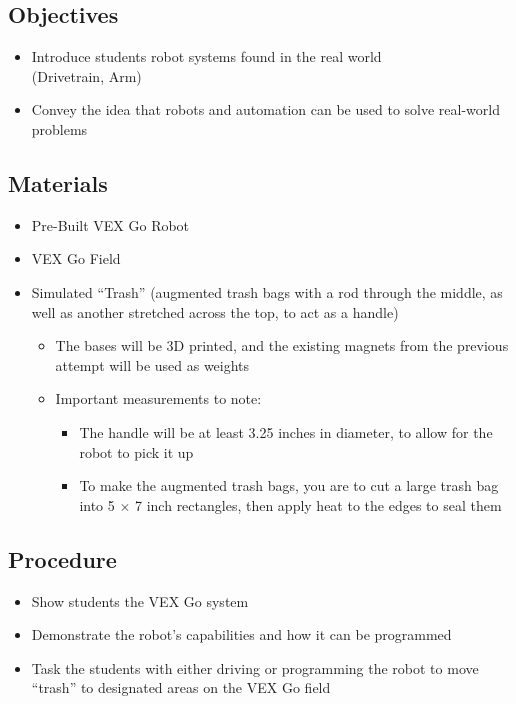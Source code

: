 \documentclass{article}
\begin{document}
    \subsection*{Objectives}
        \begin{itemize}
            \item Introduce students robot systems found in the real world \\(Drivetrain, Arm)
            \item Convey the idea that robots and automation can be used to solve real-world problems
        \end{itemize}
    \subsection*{Materials}
        \begin{itemize}
            \item Pre-Built VEX Go Robot
            \item VEX Go Field 
            \item Simulated ``Trash'' (augmented trash bags with a rod through the middle, as well as another stretched across the top, to act as a handle)
            \begin{itemize}
                \item The bases will be 3D printed, and the existing magnets from the previous attempt will be used as weights
                \item Important measurements to note:
                \begin{itemize}
                    \item The handle will be at least 3.25 inches in diameter, to allow for the robot to pick it up
                    \item To make the augmented trash bags, you are to cut a large trash bag into 5 $\times$ 7 inch rectangles, then apply heat to the edges to seal them
                \end{itemize}
            \end{itemize} 
        \end{itemize}
    \subsection*{Procedure}
        \begin{itemize}
            \item Show students the VEX Go system
            \item Demonstrate the robot's capabilities and how it can be programmed
            \item Task the students with either driving or programming the robot to move ``trash'' to designated areas on the VEX Go field
        \end{itemize} 
\pagebreak  
\end{document}

